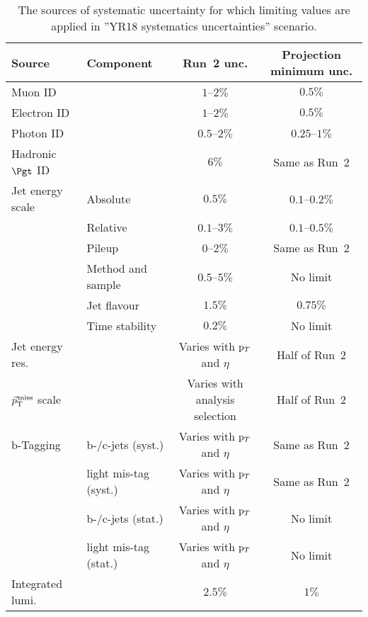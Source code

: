 \begin{table}[hbtp]
\footnotesize
\centering
\caption{The sources of systematic uncertainty for which limiting values are applied in ''YR18 systematics uncertainties'' scenario.
}

\begin{tabular}{@{} l p{3cm} c c @{}}
Source       &   Component         & Run~2 unc.             & Projection minimum unc. \\
\hline
Muon ID   &           & $1$--$2\%$            & $0.5\%$        \\
Electron ID &           & $1$--$2\%$            & $0.5\%$        \\
Photon ID   &           & $0.5$--$2\%$            & $0.25$--$1\%$    \\
Hadronic $\Pgt$ ID &         & $6\%$               & Same as Run~2    \\
Jet energy scale &  Absolute    & $0.5\%$               & $0.1$--$0.2\%$   \\
         &  Relative    & $0.1$--$3\%$            & $0.1$--$0.5\%$   \\
         &  Pileup      & $0$--$2\%$            & Same as Run~2  \\
         &  Method and sample & $0.5$--$5\%$          & No limit     \\
         &  Jet flavour       & $1.5\%$             & $0.75\%$     \\
         &  Time stability      & $0.2\%$             & No limit     \\
Jet energy res.   &     & Varies with $\mathrm{p}_{T}$ and $\eta$      & Half of Run~2   \\
${\vec p}_{\mathrm{T}}^{\kern1pt\text{miss}}$ scale       &     & Varies with analysis selection        & Half of Run~2   \\
b-Tagging   & b-/c-jets (syst.)       & Varies with $\mathrm{p}_{T}$ and $\eta$    & Same as Run~2\\
          & light mis-tag (syst.)   & Varies with $\mathrm{p}_{T}$ and $\eta$       & Same as Run~2      \\
           & b-/c-jets (stat.)    & Varies with $\mathrm{p}_{T}$ and $\eta$       & No limit        \\
          & light mis-tag (stat.)   & Varies with $\mathrm{p}_{T}$ and $\eta$       & No limit           \\
Integrated lumi.    &         & $2.5\%$                         & $1\%$          \\
\end{tabular}
\label{tab:floors}
\vspace{0.5cm}
\label{tab:systematics}
\end{table}


